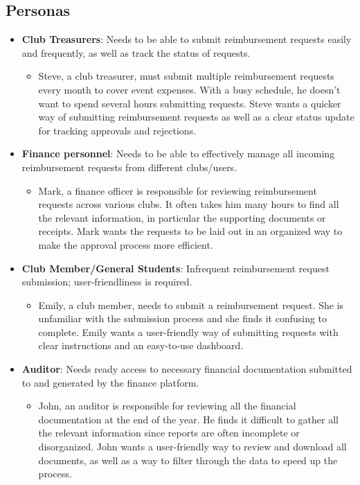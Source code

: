 \documentclass[12pt]{article}
\begin{document}
\subsection{Personas}
\begin{itemize}
    \item \textbf{Club Treasurers}: Needs to be able to submit reimbursement requests easily and frequently, as well as track the status of requests.
    \begin{itemize}
        \item Steve, a club treasurer, must submit multiple reimbursement requests every month to cover event expenses. With a busy schedule, he doesn't want to spend several hours submitting requests. Steve wants a quicker way of submitting reimbursement requests as well as a clear status update for tracking approvals and rejections.
    \end{itemize}
    \item \textbf{Finance personnel}: Needs to be able to effectively manage all incoming reimbursement requests from different clubs/users.
    \begin{itemize}
        \item Mark, a finance officer is responsible for reviewing reimbursement requests across various clubs. It often takes him many hours to find all the relevant information, in particular the supporting documents or receipts. Mark wants the requests to be laid out in an organized way to make the approval process more efficient.
    \end{itemize}
    \item \textbf{Club Member/General Students}: Infrequent reimbursement request submission; user-friendliness is required.
    \begin{itemize}
        \item Emily, a club member, needs to submit a reimbursement request. She is unfamiliar with the submission process and she finds it confusing to complete. Emily wants a user-friendly way of submitting requests with clear instructions and an easy-to-use dashboard.
    \end{itemize}
    \item \textbf{Auditor}: Needs ready access to necessary financial documentation submitted to and generated by the finance platform.
    \begin{itemize}
        \item John, an auditor is responsible for reviewing all the financial documentation at the end of the year. He finds it difficult to gather all the relevant information since reports are often incomplete or disorganized. John wants a user-friendly way to review and download all documents, as well as a way to filter through the data to speed up the process.
    \end{itemize}
\end{itemize}
\end{document}
